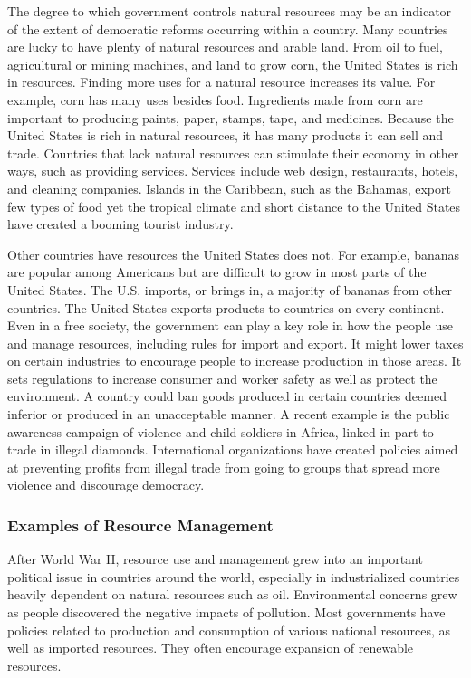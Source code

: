 The degree to which government controls natural resources may be an indicator of
the extent of democratic reforms occurring within a country. Many countries are
lucky to have plenty of natural resources and arable land. From oil to fuel,
agricultural or mining machines, and land to grow corn, the United States is
rich in resources. Finding more uses for a natural resource increases its value.
For example, corn has many uses besides food. Ingredients made from corn are
important to producing paints, paper, stamps, tape, and medicines. Because the
United States is rich in natural resources, it has many products it can sell and
trade. Countries that lack natural resources can stimulate their economy in
other ways, such as providing services. Services include web design,
restaurants, hotels, and cleaning companies. Islands in the Caribbean, such as
the Bahamas, export few types of food yet the tropical climate and short
distance to the United States have created a booming tourist industry.

Other countries have resources the United States does not. For example, bananas
are popular among Americans but are difficult to grow in most parts of the
United States. The U.S. imports, or brings in, a majority of bananas from other
countries. The United States exports products to countries on every continent.
Even in a free society, the government can play a key role in how the people use
and manage resources, including rules for import and export. It might lower
taxes on certain industries to encourage people to increase production in those
areas. It sets regulations to increase consumer and worker safety as well as
protect the environment. A country could ban goods produced in certain countries
deemed inferior or produced in an unacceptable manner. A recent example is the
public awareness campaign of violence and child soldiers in Africa, linked in
part to trade in illegal diamonds. International organizations have created
policies aimed at preventing profits from illegal trade from going to groups
that spread more violence and discourage democracy.

\subsubsection{Examples of Resource Management}

After World War II, resource use and management grew into an important political
issue in countries around the world, especially in industrialized countries
heavily dependent on natural resources such as oil. Environmental concerns grew
as people discovered the negative impacts of pollution. Most governments have
policies related to production and consumption of various national resources, as
well as imported resources. They often encourage expansion of renewable
resources.

